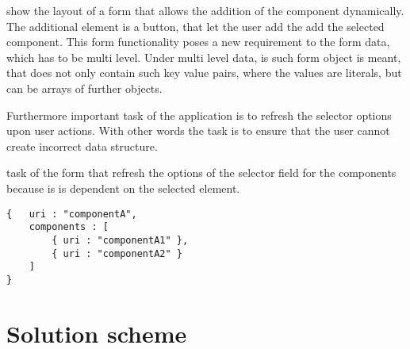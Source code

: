 


 show the layout of a form that allows the addition of the component dynamically. The additional element is a button, that let the user add the add the selected component.
This form functionality poses a new requirement to the form data, which has to be multi level. Under multi level data, is such form object is meant, that does not only contain such key value pairs, where the values are literals, but can be arrays of further objects. 


Furthermore important task of the application is to refresh the selector options upon user actions. With other words the task is to ensure that the user cannot create incorrect data structure.


task of the form that refresh the options of the selector field for the components because is is dependent on the selected element.


\begin{lstlisting}[basicstyle=\footnotesize, frame=single, caption={Multi level form data in JSON}, label=JS_subFormRoutine, captionpos=b, belowskip=1em, aboveskip=2em]
{	uri : "componentA",
	components : [
		{ uri : "componentA1" },
		{ uri : "componentA2" }
	]
}
\end{lstlisting}






\section{Solution scheme}

